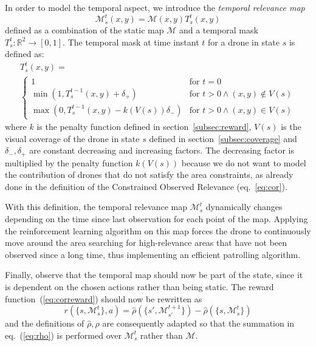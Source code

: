 \documentclass{article}
\begin{document}
In order to model the temporal aspect, we introduce the \emph{temporal relevance map} 
\begin{equation}
\mathcal{M}^t_s (x,y) = \mathcal{M}(x,y) T^t_s(x,y)
\label{eq:temporalrmap}
\end{equation}
defined as a combination of the static map $\mathcal{M}$ and a temporal mask $T^t_s: \mathbb{R}^2\to [0,1]$. The temporal mask at time instant $t$ for a drone in state $s$ is defined as:
\begin{multline}
T^t_s(x,y) = \\
\begin{cases}
	1 & \text{for } t=0 \\
	\min(1, T^{t-1}_s(x,y) + \delta_+) & \text{for } t>0 \land (x,y) \not\in V(s) \\
	\max(0, T^{t-1}_s(x,y) - k(V(s))\delta_-) & \text{for } t>0 \land (x,y) \in V(s) 
\end{cases}
\label{eq:singletemporalmask}
\end{multline} 
where $k$ is the penalty function defined in section~\ref{subsec:reward}, $V(s)$ is the visual coverage of the drone in state $s$ defined in section~\ref{subsec:coverage} and $\delta_-, \delta_+$ are constant decreasing and increasing factors. The decreasing factor is multiplied by the penalty function $k(V(s))$ because we do not want to model the contribution of drones that do not satisfy the area constraints, as already done in the definition of the Constrained Observed Relevance (eq.~\ref{eq:cor}).

With this definition, the temporal relevance map $\mathcal{M}^t_s$ dynamically changes depending on the time since last observation for each point of the map. Applying the reinforcement learning algorithm on this map forces the drone to continuously move around the area searching for high-relevance areas that have not been observed since a long time, thus implementing an efficient patrolling algorithm.

Finally, observe that the temporal map should now be part of the state, since it is dependent on the chosen actions rather than being static. The reward function~(\ref{eq:correward}) should now be rewritten as 
\begin{equation}
	r(\{s,\mathcal{M}_s^t\},a) = \hat{\rho}(\{s',\mathcal{M}_{s'}^{t+1}\})-\hat{\rho}(\{s,\mathcal{M}_s^{t}\})
	\label{eq:newreward}
\end{equation}
and the definitions of $\hat{\rho}, \rho$ are consequently adapted so that the summation in eq.~(\ref{eq:rho}) is performed over $\mathcal{M}_s^t$ rather than $\mathcal{M}$.
\end{document}
